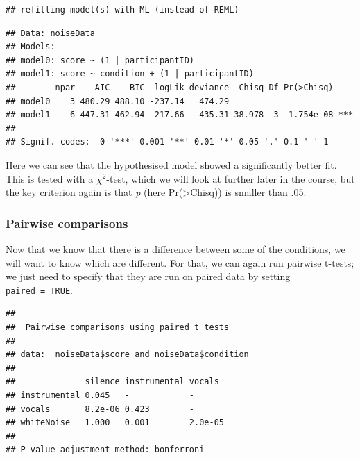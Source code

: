 \documentclass[
]{book}
\newenvironment{Shaded}{\begin{snugshade}}{\end{snugshade}}
\newcommand{\DataTypeTok}[1]{\textcolor[rgb]{0.13,0.29,0.53}{#1}}
\newcommand{\KeywordTok}[1]{\textcolor[rgb]{0.13,0.29,0.53}{\textbf{#1}}}
\newcommand{\NormalTok}[1]{#1}
\newcommand{\OperatorTok}[1]{\textcolor[rgb]{0.81,0.36,0.00}{\textbf{#1}}}
\newcommand{\OtherTok}[1]{\textcolor[rgb]{0.56,0.35,0.01}{#1}}
\newcommand{\StringTok}[1]{\textcolor[rgb]{0.31,0.60,0.02}{#1}}
\begin{document}
\begin{verbatim}
## refitting model(s) with ML (instead of REML)
\end{verbatim}

\begin{verbatim}
## Data: noiseData
## Models:
## model0: score ~ (1 | participantID)
## model1: score ~ condition + (1 | participantID)
##        npar    AIC    BIC  logLik deviance  Chisq Df Pr(>Chisq)    
## model0    3 480.29 488.10 -237.14   474.29                         
## model1    6 447.31 462.94 -217.66   435.31 38.978  3  1.754e-08 ***
## ---
## Signif. codes:  0 '***' 0.001 '**' 0.01 '*' 0.05 '.' 0.1 ' ' 1
\end{verbatim}

Here we can see that the hypothesised model showed a significantly better fit. This is tested with a \(\chi^2\)-test, which we will look at further later in the course, but the key criterion again is that \emph{p} (here Pr(\textgreater Chisq)) is smaller than .05.

\hypertarget{pairwise-comparisons-1}{%
\subsubsection{Pairwise comparisons}\label{pairwise-comparisons-1}}

Now that we know that there is a difference between some of the conditions, we will want to know which are different. For that, we can again run pairwise t-tests; we just need to specify that they are run on paired data by setting \texttt{paired\ =\ TRUE}.

\begin{Shaded}
\end{Shaded}

\begin{verbatim}
## 
## 	Pairwise comparisons using paired t tests 
## 
## data:  noiseData$score and noiseData$condition 
## 
##              silence instrumental vocals 
## instrumental 0.045   -            -      
## vocals       8.2e-06 0.423        -      
## whiteNoise   1.000   0.001        2.0e-05
## 
## P value adjustment method: bonferroni
\end{verbatim}
\end{document}
